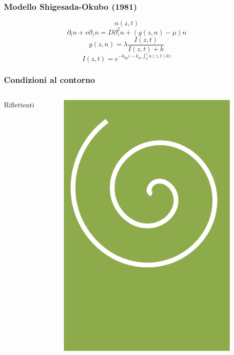 \begin{frame}
  \frametitle{Modello Shigesada-Okubo (1981)}
  \[ n(z,t) \]
  \[ \partial_t n + v \partial_z n = D \partial_z^2 n + (g(z,n) - \mu) n \]
  \[ g(z,n) =  \lambda \frac{I(z,t)}{I(z,t)+h} \]
  \[ I(z,t) = e^{-k_{bg} z - k_{as}\int_0^z n(z,t) \mathrm{d}z } \]

\end{frame}

\begin{frame}
  \frametitle{Condizioni al contorno}

  \begin{columns}
    Riflettenti 
    \begin{figure}
      \includegraphics[width=.7\textwidth]{../img/noML}
    \end{figure}


\end{columns}
\end{frame}
